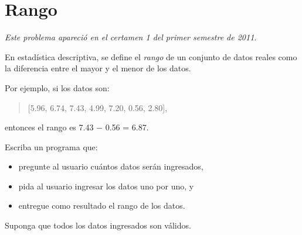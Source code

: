 \section{Rango}

\emph{Este problema apareció en el certamen 1 del primer semestre de
2011.}

En estadística descriptiva, se define el \emph{rango} de un conjunto de
datos reales como la diferencia entre el mayor y el menor de los datos.

Por ejemplo, si los datos son:

\begin{quote}
{[}5.96, 6.74, 7.43, 4.99, 7.20, 0.56, 2.80{]},
\end{quote}

entonces el rango es 7.43 − 0.56 = 6.87.

Escriba un programa que:

\begin{itemize}
\item
  pregunte al usuario cuántos datos serán ingresados,
\item
  pida al usuario ingresar los datos uno por uno, y
\item
  entregue como resultado el rango de los datos.
\end{itemize}

Suponga que todos los datos ingresados son válidos.
